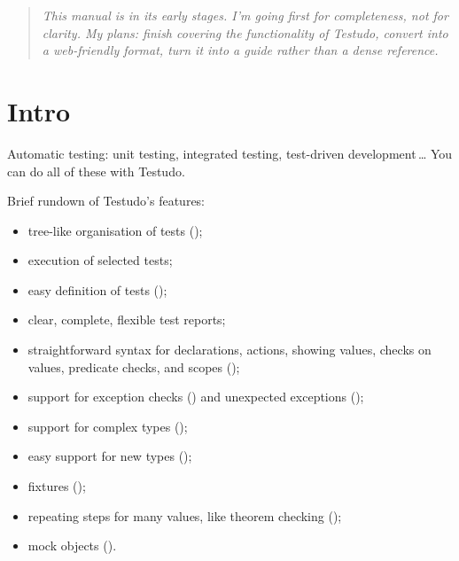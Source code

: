\documentclass[twoside, a4paper, article]{memoir}
\newcommand*\ellipsis{\,\ldots}
\begin{document}
\thispagestyle{empty}

\cleardoublepage

\frontmatter

\maketitle

\tableofcontents*
\listoffigures*
\listoftables*

\cleartooddpage

\begin{quote}
  \emph{This manual is in its early stages.  I'm going first for completeness,
    not for clarity.  My plans: finish covering the functionality of Testudo,
    convert into a web-friendly format, turn it into a guide rather than a
    dense reference.}
\end{quote}

\chapter{Intro}
\label{cha:intro}

Automatic testing: unit testing, integrated testing, test-driven
development\ellipsis{}  You can do all of these with Testudo.

Brief rundown of Testudo's features:
\begin{itemize}
\item tree-like organisation of tests ();
\item execution of selected tests;
\item easy definition of tests ();
\item clear, complete, flexible test reports;
\item straightforward syntax for declarations, actions, showing values, checks
  on values, predicate checks, and scopes ();
\item support for exception checks () and unexpected
  exceptions ();
\item support for complex types ();
\item easy support for new types ();
\item fixtures ();
\item repeating steps for many values, like theorem checking
  ();
\item mock objects ().
\end{itemize}
\end{document}
